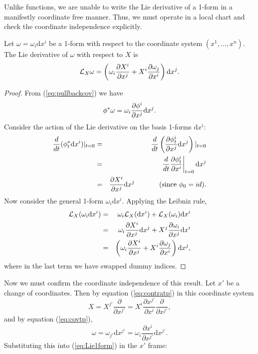 Unlike functions, we are unable to write the Lie derivative of a 1-form in a manifestly coordinate free manner. Thus, we must operate in a local chart and check the coordinate independence explicitly.

\begin{thm}
 Let $\omega=\omega_i \mbox{d}x^i $ be a 1-form with respect to the coordinate system $(x^1,\dots,x^n)$. The Lie derivative of $\omega$ with respect to $X$ is
\begin{equation} {\mathcal{L}}_X \omega = \left(\omega_i \frac{\partial X^i}{\partial x^j}+X^i \frac{\partial \omega_j }{\partial x^i} \right)\mbox{d}x^j. \label{eq:Lie1form} \end{equation}
\end{thm}
\begin{proof}
From (\ref{eq:pullbackcov}) we have
\[ \phi^*\omega = \omega_i \frac{{\partial} \phi^i}{{\partial} x^j} \mbox{d}x^j. \]
Consider the action of the Lie derivative on the basis 1-forms $\mbox{d}x^i$:
\begin{eqnarray}
\frac{d}{dt}(\phi^*_t \mbox{d}x^i)|_{t=0} &=& \frac{d}{dt}\left(\frac{{\partial} \phi^i_t}{{\partial} x^j}\mbox{d}x^j\right)|_{t=0}\nonumber\\
&=& \left.\frac{d}{dt}\frac{{\partial}\phi^i_t}{{\partial} x^i}\right|_{t=0}\mbox{d}x^j \nonumber \\
&=& \frac{{\partial} X^i}{{\partial} x^j}\mbox{d}x^j \mbox{ \hspace{1cm} (since $\phi_0=id$).} \label{eq:Liebasis1form}
\end{eqnarray}
Now consider the general 1-form $\omega_i \mbox{d}x^i$. Applying the Leibniz rule,
\begin{eqnarray*}
{\mathcal{L}}_X(\omega_i \mbox{d}x^i)&=& \omega_i {\mathcal{L}}_X(\mbox{d}x^i)+{\mathcal{L}}_X(\omega_i) \mbox{d}x^i\\
&=& \omega_i\frac{{\partial} X^i}{{\partial} x^j}\mbox{d}x^j+X^j\frac{{\partial} \omega_i}{{\partial} x^j} \mbox{d}x^i\\
&=& \left( \omega_i\frac{{\partial} X^i}{{\partial} x^j}+X^i\frac{{\partial}\omega_j}{{\partial} x^i} \right)\mbox{d}x^j,
\end{eqnarray*}
where in the last term we have swapped dummy indices.
\end{proof}

Now we must confirm the coordinate independence of this result. Let $x'$ be a change of coordinates. Then by equation (\ref{eq:contratp}) in this coordinate system 
\[X = X^{j'}\frac{\partial}{\partial x^{j'}}=X^i \frac{\partial x^{j'}}{\partial x^i} \frac{\partial}{\partial x^{j'}},\]
and by equation (\ref{eq:covtp}),
 \[\omega=\omega_{j'}\mbox{d}x^{j'}=\omega_i \frac{\partial x^i}{\partial x^{j'}} \mbox{d}x^{j'}.\]
Substituting this into (\ref{eq:Lie1form}) in the $x'$ frame:

